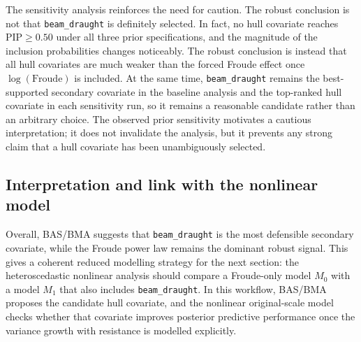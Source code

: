 \documentclass[12pt,a4paper]{article}
\begin{document}
\begin{table}[h]
	\centering
	\caption{Sensitivity of posterior inclusion probabilities to alternative BAS/BMA prior specifications.}
	\label{tab:bas_sensitivity}
\end{table}

The sensitivity analysis reinforces the need for caution. The robust conclusion
is not that \texttt{beam\_draught} is definitely selected. In fact, no hull
covariate reaches $\mathrm{PIP}\ge0.50$ under all three prior specifications,
and the magnitude of the inclusion probabilities changes noticeably. The robust
conclusion is instead that all hull covariates are much weaker than the forced
Froude effect once $\log(\mathrm{Froude})$ is included. At the same time,
\texttt{beam\_draught} remains the best-supported secondary covariate in the
baseline analysis and the top-ranked hull covariate in each sensitivity run, so
it remains a reasonable candidate rather than an arbitrary choice. The observed
prior sensitivity motivates a cautious interpretation; it does not invalidate
the analysis, but it prevents any strong claim that a hull covariate has been
unambiguously selected.

\subsection{Interpretation and link with the nonlinear model}

Overall, BAS/BMA suggests that \texttt{beam\_draught} is the most defensible
secondary covariate, while the Froude power law remains the dominant robust
signal. This gives a coherent reduced modelling strategy for the next section:
the heteroscedastic nonlinear analysis should compare a Froude-only model
$M_0$ with a model $M_1$ that also includes \texttt{beam\_draught}. In this
workflow, BAS/BMA proposes the candidate hull covariate, and the nonlinear
original-scale model checks whether that covariate improves posterior
predictive performance once the variance growth with resistance is modelled
explicitly.
\end{document}
